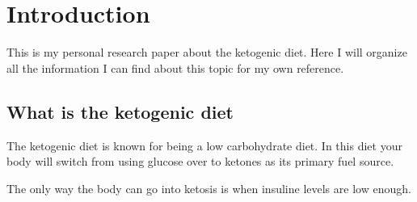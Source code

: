 \section{Introduction}

This is my personal research paper about the ketogenic diet. Here I will organize all the information I can find about this topic for my own reference. 

\subsection{What is the ketogenic diet}

The ketogenic diet is known for being a low carbohydrate diet. In this diet your body will switch from using glucose over to ketones as its primary fuel source. 

The only way the body can go into ketosis is when insuline levels are low enough. 